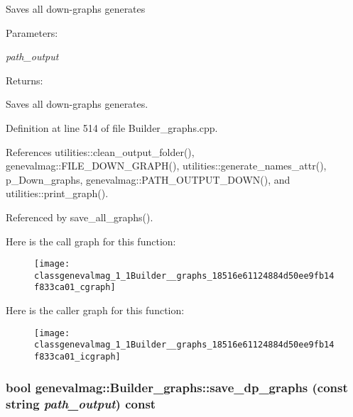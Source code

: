 Saves all down-graphs generates \begin{Desc}
\item[Parameters:]
\begin{description}
\item[{\em path\_\-output}]\end{description}
\end{Desc}
\begin{Desc}
\item[Returns:]\end{Desc}
Saves all down-graphs generates. 

Definition at line 514 of file Builder\_\-graphs.cpp.

References utilities::clean\_\-output\_\-folder(), genevalmag::FILE\_\-DOWN\_\-GRAPH(), utilities::generate\_\-names\_\-attr(), p\_\-Down\_\-graphs, genevalmag::PATH\_\-OUTPUT\_\-DOWN(), and utilities::print\_\-graph().

Referenced by save\_\-all\_\-graphs().

Here is the call graph for this function:\nopagebreak
\begin{figure}[H]
\begin{center}
\leavevmode
\texttt{[image: classgenevalmag\_1\_1Builder\_\_graphs\_18516e61124884d50ee9fb14f833ca01\_cgraph]}
\end{center}
\end{figure}


Here is the caller graph for this function:\nopagebreak
\begin{figure}[H]
\begin{center}
\leavevmode
\texttt{[image: classgenevalmag\_1\_1Builder\_\_graphs\_18516e61124884d50ee9fb14f833ca01\_icgraph]}
\end{center}
\end{figure}
\hypertarget{classgenevalmag_1_1Builder__graphs_525d16f83c419ec6751379b860c625d6}{
\subsubsection[{save\_\-dp\_\-graphs}]{\setlength{\rightskip}{0pt plus 5cm}bool genevalmag::Builder\_\-graphs::save\_\-dp\_\-graphs (const string {\em path\_\-output}) const}}
\label{classgenevalmag_1_1Builder__graphs_525d16f83c419ec6751379b860c625d6}


